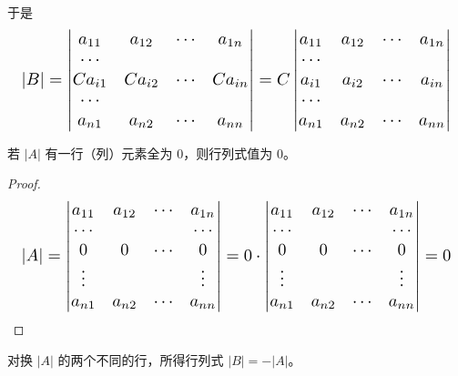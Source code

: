 于是
\[
\resizebox{0.98\linewidth}{!}{$\displaystyle
|B|=\begin{vmatrix}
a_{11} & a_{12} & \cdots & a_{1n}\\
\cdots & & & \\
Ca_{i1} & Ca_{i2} & \cdots & Ca_{in}\\
\cdots & & & \\
a_{n1} & a_{n2} & \cdots & a_{nn}
\end{vmatrix}
=C\begin{vmatrix}
a_{11} & a_{12} & \cdots & a_{1n}\\
\cdots & & & \\
a_{i1} & a_{i2} & \cdots & a_{in}\\
\cdots & & & \\
a_{n1} & a_{n2} & \cdots & a_{nn}
\end{vmatrix}$}
\]

\begin{proposition}[性质 2]
若 $|A|$ 有一行（列）元素全为 $0$，则行列式值为 $0$。
\end{proposition}

\begin{proof}
\[
\resizebox{0.98\linewidth}{!}{$\displaystyle
|A|=\begin{vmatrix}
a_{11} & a_{12} & \cdots & a_{1n}\\
\cdots & & & \cdots\\
0 & 0 & \cdots & 0\\
\vdots & & & \vdots\\
a_{n1} & a_{n2} & \cdots & a_{nn}
\end{vmatrix}
=0\cdot
\begin{vmatrix}
a_{11} & a_{12} & \cdots & a_{1n}\\
\cdots & & & \cdots\\
0 & 0 & \cdots & 0\\
\vdots & & & \vdots\\
a_{n1} & a_{n2} & \cdots & a_{nn}
\end{vmatrix}
=0$}
\]
\end{proof}

\begin{proposition}[性质 4]
对换 $|A|$ 的两个不同的行，所得行列式 $|B|=-|A|$。
\end{proposition}

